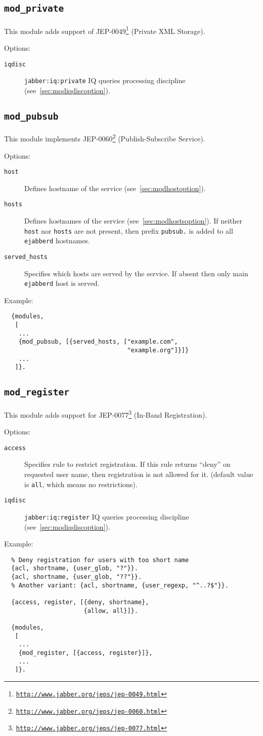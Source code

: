 \documentclass[a4paper,10pt]{article}
\newcommand{\bracehack}{\def\{{\char"7B}\def\}{\char"7D}}
\newcommand{\ns}[1]{\texttt{#1}}
\newcommand{\jid}[1]{\texttt{#1}}
\newcommand{\term}[1]{\texttt{#1}}
\newcommand{\ejabberd}{\texttt{ejabberd}}
\newcommand{\module}[1]{\texttt{#1}}
\newcommand{\modprivate}{\module{mod\_private}}
\newcommand{\modpubsub}{\module{mod\_pubsub}}
\newcommand{\modregister}{\module{mod\_register}}
\newcommand{\titem}[1]{\item[\bracehack\texttt{#1}]}
\gdef\footahref#1#2{#2\footnote{\href{#1}{\texttt{#1}}}}
\newcommand{\tjepref}[2]{\footahref{http://www.jabber.org/jeps/jep-#1.html}{#2}}
\newcommand{\jepref}[1]{\tjepref{#1}{JEP-#1}}
\newcommand{\iqdiscitem}[1]{\titem{iqdisc} #1 IQ queries processing
discipline (see~\ref{sec:modiqdiscoption}).}
\newcommand{\hostitem}[1]{
  \titem{host} Defines hostname of the service
  (see~\ref{sec:modhostoption}).
  \titem{hosts} Defines hostnames of the service
  (see~\ref{sec:modhostsoption}).  If neither \texttt{host} nor \texttt{hosts}
  are not present, then prefix \jid{#1.} is added to all \ejabberd{} hostnames.
}
\begin{document}
\subsection{\modprivate{}}
\label{sec:modprivate}

This module adds support of \jepref{0049} (Private XML Storage).

Options:
\begin{description}
\iqdiscitem{\ns{jabber:iq:private}}
\end{description}


\subsection{\modpubsub{}}
\label{sec:modpubsub}

This module implements \jepref{0060} (Publish-Subscribe Service).

Options:
\begin{description}
\hostitem{pubsub}
\titem{served\_hosts} Specifies which hosts are served by the service.
If absent then only main \ejabberd{} host is served.
\end{description}

Example:
\begin{verbatim}
  {modules,
   [
    ...
    {mod_pubsub, [{served_hosts, ["example.com",
                                  "example.org"]}]}
    ...
   ]}.
\end{verbatim}


\subsection{\modregister{}}
\label{sec:modregister}

This module adds support for \jepref{0077} (In-Band Registration).

Options:
\begin{description}
\titem{access} Specifies rule to restrict registration.
If this rule returns ``deny'' on requested user name, then
registration is not allowed for it. (default value is \term{all}, which means
no restrictions).
\iqdiscitem{\ns{jabber:iq:register}}
\end{description}

Example:
\begin{verbatim}
  % Deny registration for users with too short name
  {acl, shortname, {user_glob, "?"}}.
  {acl, shortname, {user_glob, "??"}}.
  % Another variant: {acl, shortname, {user_regexp, "^..?$"}}.

  {access, register, [{deny, shortname},
                      {allow, all}]}.

  {modules,
   [
    ...
    {mod_register, [{access, register}]},
    ...
   ]}.
\end{verbatim}
\end{document}
